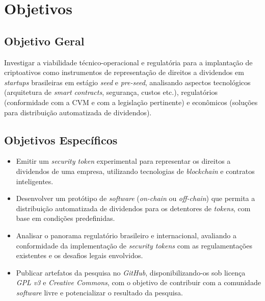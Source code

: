 \documentclass[12pt, a4paper, oneside, openright, chapter=TITLE]{abntex2}
\begin{document}
\clearpage
\section{Objetivos}
\subsection{Objetivo Geral}

\hspace*{\parindent} Investigar a viabilidade técnico-operacional e regulatória para a implantação de criptoativos como instrumentos de representação de direitos a dividendos em \textit{startups} brasileiras em estágio \textit{seed} e \textit{pre-seed}, analisando aspectos tecnológicos (arquitetura de \textit{smart contracts}, segurança, custos etc.), regulatórios (conformidade com a CVM e com a legislação pertinente) e econômicos (soluções para distribuição automatizada de dividendos).

\subsection{Objetivos Específicos}
\begin{itemize}
    \item Emitir um \textit{security token} experimental para representar os direitos a dividendos de uma empresa, utilizando tecnologias de \textit{blockchain} e contratos inteligentes.

    \item Desenvolver um protótipo de \textit{software} (\textit{on-chain} ou \textit{off-chain}) que permita a distribuição automatizada de dividendos para os detentores de \textit{tokens}, com base em condições predefinidas.
    
    \item Analisar o panorama regulatório brasileiro e internacional, avaliando a conformidade da implementação de \textit{security tokens} com as regulamentações existentes e os desafios legais envolvidos.
    
    \item Publicar artefatos da pesquisa no \textit{GitHub}, disponibilizando-os sob licença \textit{GPL v3} e \textit{Creative Commons}, com o objetivo de contribuir com a comunidade \textit{software} livre e potencializar o resultado da pesquisa.
\end{itemize}

\clearpage
\end{document}

